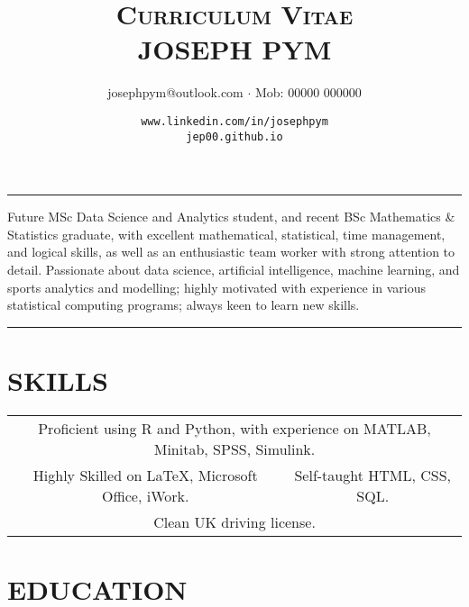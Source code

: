 \documentclass[9pt,a4paper]{article}
\title{\scshape{Curriculum Vitae}\\JOSEPH PYM}\author{josephpym@outlook.com $\cdot$ Mob: 00000 000000}\date{\texttt{www.linkedin.com/in/josephpym} \\ \texttt{jep00.github.io}}
\begin{document}
\maketitle\setcounter{secnumdepth}{0}
\begin{center}\rule{0.5\textwidth}{0.3pt}\end{center}
\begin{center} %
\noindent Future MSc Data Science and Analytics student, and recent BSc Mathematics \& Statistics graduate, with excellent mathematical, statistical, time management, and logical skills, as well as an enthusiastic team worker with strong attention to detail. Passionate about data science, artificial intelligence, machine learning, and sports analytics and modelling; highly motivated with experience in various statistical computing programs; always keen to learn new skills.\end{center}
\begin{center}\rule{0.5\textwidth}{0.3pt}\end{center}

\section{SKILLS}
\begin{center}\begin{tabular}{cc}
\multicolumn{2}{c}{Proficient using R and Python, with experience on MATLAB, Minitab, SPSS, Simulink.}\\
Highly Skilled on \LaTeX, Microsoft Office, iWork. & Self-taught HTML, CSS, SQL.\\
\multicolumn{2}{c}{Clean UK driving license.}
\end{tabular}\end{center}


\section{EDUCATION}
	
\end{document}
